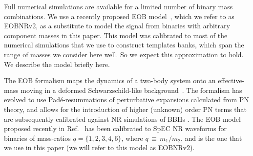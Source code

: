 

Full numerical simulations are available for a limited number of binary 
mass combinations. We use a recently proposed EOB 
model~\cite{BuonannoEOBv2Main}, which we refer to as EOBNRv2, as a substitute
to model the signal from binaries with arbitrary component masses
in this paper. This model was calibrated to most of the numerical simulations
that we use to construct templates banks, which span the range of masses 
we consider here well. So we expect this approximation to hold. We describe the
model briefly here.

The EOB formalism maps the dynamics of a two-body system onto an effective-mass
moving in a deformed Schwarzschild-like background~\citep{EOBOriginalBuonannoDamour}.
The formalism has evolved to use Pad\'{e}-resummations of perturbative 
expansions calculated from PN theory, and allows for the introduction of higher
(unknown) order PN terms that are subsequently calibrated against NR 
simulations of BBHs 
\cite{EOBdevel01,EOBdevel02,EOBNRdevel03,DamourFluxhlm01,EOBNRdevel01}. The EOB 
model proposed recently in Ref.~\citep{BuonannoEOBv2Main} has been calibrated 
to SpEC NR waveforms for binaries of mass-ratios $q=\{1,2,3,4,6\}$, where 
$q\,\equiv \, m_1/m_2$, and is the one that we use in this paper (we will refer
to this model as EOBNRv2).

